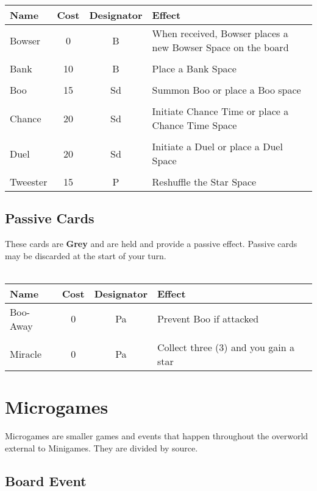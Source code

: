 \documentclass{article}
\begin{document}
\begin{tabular}{lccp{5cm}}
\textbf{Name} & \textbf{Cost} & \textbf{Designator} & \textbf{Effect} \\
\hline
Bowser & 0 & B & When received, Bowser places a new Bowser Space on the board \\
&&& \\
Bank & 10 & B & Place a Bank Space \\
&&& \\
Boo & 15 & Sd & Summon Boo or place a Boo space \\
&&& \\
Chance & 20 & Sd & Initiate Chance Time or place a Chance Time Space \\
&&& \\
Duel & 20 & Sd & Initiate a Duel or place a Duel Space \\
&&& \\
Tweester & 15 & P & Reshuffle the Star Space \\
\end{tabular}

\subsection{Passive Cards}

These cards are \textbf{Grey} and are held and provide a passive effect.
Passive cards may be discarded at the start of your turn.
\\\\

\begin{tabular}{lccp{5cm}}
\textbf{Name} & \textbf{Cost} & \textbf{Designator} & \textbf{Effect} \\
\hline
Boo-Away & 0 & Pa & Prevent Boo if attacked \\
&&& \\
Miracle & 0 & Pa & Collect three (3) and you gain a star \\
\end{tabular}

\section{Microgames}

Microgames are smaller games and events that happen throughout the overworld external
to Minigames.  They are divided by source.

\subsection{Board Event}
\end{document}
